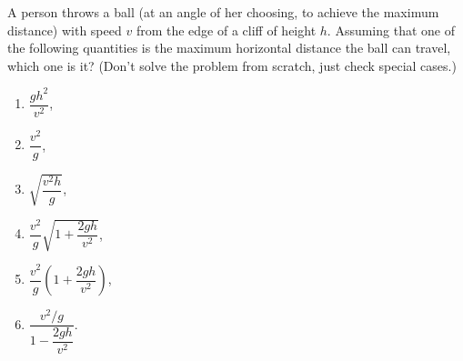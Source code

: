 A person throws a ball (at an angle of her choosing, to achieve the maximum distance) with speed $v$ from the edge of a cliff of height $h$. Assuming that one of the following quantities is the maximum horizontal distance the ball can travel, which one is it? (Don't solve the problem from scratch, just check special cases.)
\begin{enumerate}
\item $\dfrac{gh^2}{v^2}$,
\item $\dfrac{v^2}{g}$,
\item $\sqrt{\dfrac{v^2 h}{g}}$,
\item $\dfrac{v^2}{g}\sqrt{1+\dfrac{2gh}{v^2}}$,
\item $\dfrac{v^2}{g}\left(1+\dfrac{2gh}{v^2}\right)$,
\item $\dfrac{v^2/g}{1-\dfrac{2gh}{v^2}}$.
\end{enumerate}